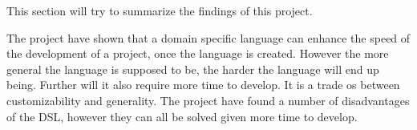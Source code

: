 This section will try to summarize the findings of this project.

The project have shown that a domain specific language can enhance the speed of the development of a project, once the language is created.
However the more general the language is supposed to be, the harder the language will end up being. 
Further will it also require more time to develop.
It is a trade os between customizability and generality.
The project have found a number of disadvantages of the DSL, however they can all be solved given more time to develop.


